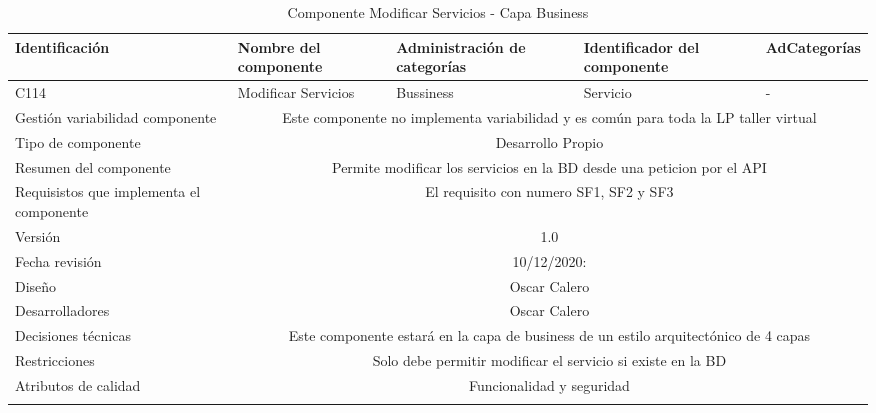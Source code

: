 \documentclass[10pt,a4paper,openany]{book}
\begin{document}
\begin{longtable}{|p{3cm}|p{3cm}|p{3cm}|p{3cm}|p{3cm}|} \hline
Identificación & Nombre del componente & Administración de categorías & Identificador del componente & AdCategorías \\[0.5ex] \hline
C114& Modificar Servicios& Bussiness& Servicio& -\\[0.5ex] \hline
Gestión variabilidad componente & \multicolumn{4}{|c|}{Este componente no implementa variabilidad y es común para toda la LP taller virtual} \\ \hline
Tipo de componente & \multicolumn{4}{|c|}{Desarrollo Propio} \\ \hline
Resumen del componente & \multicolumn{4}{|c|}{Permite modificar los servicios en la BD desde una peticion por el API} \\ \hline
Requisistos que implementa el componente & \multicolumn{4}{|c|}{El requisito con numero SF1, SF2 y SF3 } \\ \hline
Versión & \multicolumn{4}{|c|}{1.0 } \\ \hline
Fecha revisión & \multicolumn{4}{|c|}{ 10/12/2020:} \\ \hline
Diseño & \multicolumn{4}{|c|}{Oscar Calero} \\ \hline
Desarrolladores & \multicolumn{4}{|c|}{Oscar Calero} \\ \hline
Decisiones técnicas & \multicolumn{4}{|c|}{Este componente estará en la capa de business de un estilo arquitectónico de 4 capas  } \\ \hline
Restricciones & \multicolumn{4}{|c|}{Solo debe permitir modificar el servicio si existe en la BD} \\ \hline
Atributos de calidad & \multicolumn{4}{|c|}{Funcionalidad y seguridad} \\ \hline
\caption{Componente Modificar Servicios - Capa Business}
\label{table:t6}
\end{longtable}
\end{document}
